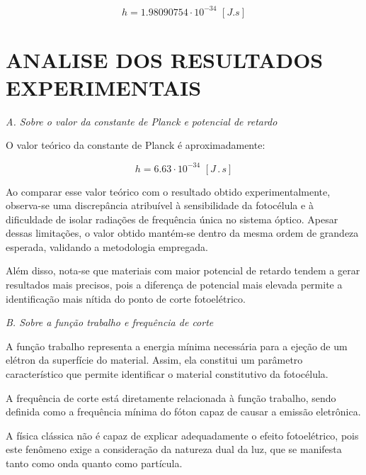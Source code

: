 \documentclass[10pt,twocolumn,letterpaper]{article}
\begin{document}
\begin{equation*}
    h = 1.98090754\cdot 10^{-34} \,\, [J.s]
\end{equation*}

\vspace{.75cm}

\section{ANALISE DOS RESULTADOS EXPERIMENTAIS}

\noindent\textit{A. Sobre o valor da constante de Planck e potencial de
retardo}

\noindent O valor teórico da constante de Planck é aproximadamente:

\vspace{-.3cm}

\begin{equation*}
    h = 6.63 \cdot 10^{-34} \,\, [J\,.\,s]
\end{equation*}

\vspace{-.22cm}

\hspace{1cm} Ao comparar esse valor teórico com o resultado obtido experimentalmente, observa-se uma discrepância atribuível à sensibilidade da fotocélula e à dificuldade de isolar radiações de frequência única no sistema óptico. Apesar dessas limitações, o valor obtido mantém-se dentro da mesma ordem de grandeza esperada, validando a metodologia empregada.

\hspace{1cm} Além disso, nota-se que materiais com maior potencial de retardo tendem a gerar resultados mais precisos, pois a diferença de potencial mais elevada permite a identificação mais nítida do ponto de corte fotoelétrico.

\noindent\textit{B. Sobre a função trabalho e frequência de corte}

\hspace{1cm} A função trabalho representa a energia mínima necessária para a ejeção de um elétron da superfície do material. Assim, ela constitui um parâmetro característico que permite identificar o material constitutivo da fotocélula.

\hspace{1cm} A frequência de corte está diretamente relacionada à função trabalho, sendo definida como a frequência mínima do fóton capaz de causar a emissão eletrônica.

\hspace{1cm} A física clássica não é capaz de explicar adequadamente o efeito fotoelétrico, pois este fenômeno exige a consideração da natureza dual da luz, que se manifesta tanto como onda quanto como partícula.
\end{document}
